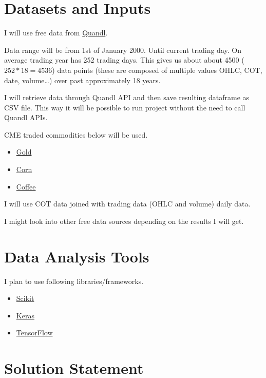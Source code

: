 \documentclass[final,2p]{elsarticle}
\begin{document}
\section{Datasets and Inputs}

I will use free data from \href{https://www.quandl.com/}{Quandl}. 

Data range will be from 1st of January 2000. Until current trading day. On average trading year has 252 trading days. This gives us about about 4500 ($252*18 = 4536$) data points (these are composed of multiple values OHLC, COT, date, volume\ldots) over past approximately 18 years.

I will retrieve data through Quandl API and then save resulting dataframe as CSV file.
This way it will be possible to run project without the need to call Quandl APIs.

CME traded commodities below will be used.

\begin{itemize}
\item \href{https://www.cmegroup.com/trading/metals/precious/gold.html}{Gold}
\item \href{https://www.cmegroup.com/trading/agricultural/grain-and-oilseed/corn.html}{Corn}
\item \href{https://www.cmegroup.com/trading/agricultural/softs/coffee.html}{Coffee}
\end{itemize}

I will use COT data joined with trading data (OHLC and volume) daily data.

I might look into other free data sources depending on the results I will get.

\section{Data Analysis Tools}

I plan to use following libraries/frameworks.

\begin{itemize}
    \item \href{https://scikit-learn.org/}{Scikit}
    \item \href{https://keras.io/}{Keras}
    \item \href{https://www.tensorflow.org/}{TensorFlow}
\end{itemize}

\section{Solution Statement}
\end{document}
